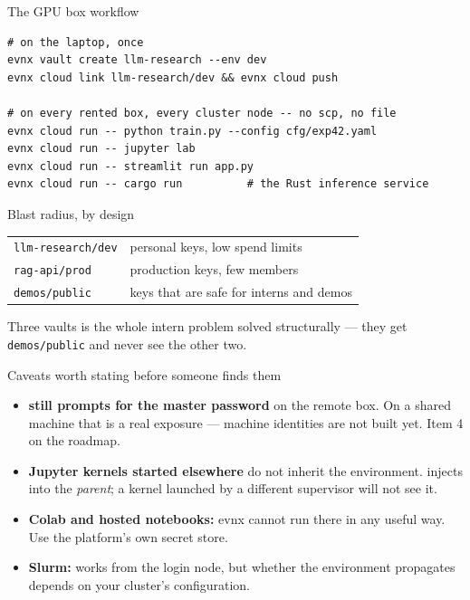 \documentclass[aspectratio=169,10pt]{beamer}
\begin{document}
\begin{frame}[fragile]{The GPU box workflow}
\begin{lstlisting}[style=evnxcode]
# on the laptop, once
evnx vault create llm-research --env dev
evnx cloud link llm-research/dev && evnx cloud push

# on every rented box, every cluster node -- no scp, no file
evnx cloud run -- python train.py --config cfg/exp42.yaml
evnx cloud run -- jupyter lab
evnx cloud run -- streamlit run app.py
evnx cloud run -- cargo run          # the Rust inference service
\end{lstlisting}

  \vspace{0.6em}
  \begin{block}{Blast radius, by design}
    \begin{tabular}{@{}ll@{}}
      \texttt{llm-research/dev}  & personal keys, low spend limits \\
      \texttt{rag-api/prod}      & production keys, few members \\
      \texttt{demos/public}      & keys that are safe for interns and demos \\
    \end{tabular}
  \end{block}
  {\footnotesize Three vaults is the whole intern problem solved structurally ---
  they get \texttt{demos/public} and never see the other two.}
\end{frame}

\begin{frame}{Caveats worth stating before someone finds them}
  \small
  \begin{itemize}
    \item \textbf{ still prompts for the master password} on the
          remote box. On a shared machine that is a real exposure --- machine
          identities are not built yet. Item 4 on the roadmap.
    \item \textbf{Jupyter kernels started elsewhere} do not inherit the
          environment.  injects into the
          \emph{parent}; a kernel launched by a different supervisor will not
          see it.
    \item \textbf{Colab and hosted notebooks:} evnx cannot run there in any
          useful way. Use the platform's own secret store.
    \item \textbf{Slurm:}  works from
          the login node, but whether the environment propagates depends on
          your cluster's configuration.
  \end{itemize}
\end{frame}
\end{document}
